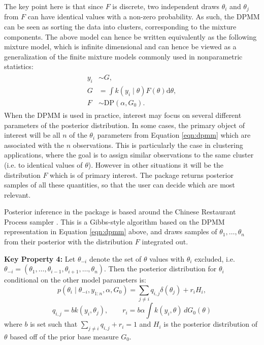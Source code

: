\documentclass[nojss]{jss}
\begin{document}
The key point here is that since $F$ is discrete, two independent draws $\theta_i$ and $\theta_j$ from $F$  can have identical values with a non-zero probability. As such, the DPMM can be seen as sorting the data into clusters, corresponding to the mixture components. The above model can hence be written equivalently as the following mixture model, which is infinite dimensional and can hence be viewed as a generalization of the finite mixture models commonly used in nonparametric statistics:
\begin{align*}
\begin{split}
y_i &\sim G, \\
G & = \int k(y_i \mid \theta) F(\theta) \mathrm{d} \theta ,\\
F &\sim \text{DP} (\alpha, G_0).
\end{split}
\label{eqn:dp2}
\end{align*}
When the DPMM is used in practice, interest may focus on several different parameters of the posterior distribution. In some cases, the primary object of interest will be all $n$ of the ${\theta_i}$ parameters from Equation \ref{eqn:dpmm} which are associated with the $n$ observations. This is particularly the case in clustering applications, where the goal is to assign similar observations to the same cluster (i.e. to identical values of $\theta$). However in other situations it will be the distribution $F$ which is of primary interest. The  package returns posterior samples of all these quantities, so that the user can decide which are most relevant.

Posterior inference in the  package is based around the Chinese Restaurant Process sampler \citep{neal_markov_2000}. This is a Gibbs-style algorithm based on the DPMM representation in Equation \ref{eqn:dpmm} above, and draws samples of $\theta_1,\ldots,\theta_n$ from their posterior with the distribution $F$ integrated out.

\begin{tcolorbox}
\textbf{Key Property 4:}   Let $\theta_{-i}$ denote the set of $\theta$ values with $\theta_i$ excluded, i.e.\ $\theta_{-i} =
(\theta_1, \ldots, \theta_{i-1}, \theta_{i+1}, \ldots, \theta_n)$. Then the posterior distribution for $\theta_i$ conditional on the
other model parameters is:
\[
p(\theta_i \mid \theta_{-i}, y_{1:n}, \alpha, G_0) = \sum_{j \neq i} q_{i,j}\delta(\theta_j) + r_i H_i,
\]
\[
q_{i,j} = b k(y_i, \theta_j), \qquad r_i = b \alpha \int k(y_i, \theta)\,dG_0(\theta)
\]
where $b$ is set such that $\sum_{j \neq i} q_{i,j} + r_i = 1$ and $H_i$ is the posterior distribution of $\theta$
based off of the prior base measure $G_0$.
\end{tcolorbox}
\end{document}
